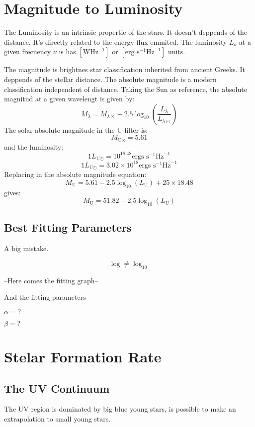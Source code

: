 \documentclass[manuscript]{aastex}
\begin{document}
\section{Magnitude to Luminosity}
The Luminosity is an intrinsic propertie of the stars. It doesn't deppends of the distance. 
It's directly related to the energy flux emmited. The luminosity $L_\nu$ at a given frecuency 
$\nu$ is has $[\textrm{W}\textrm{Hz}^{-1}]$ or $[\textrm{erg }\textrm{s}^{-1}\textrm{Hz}^{-1}]$ units.

The magnitude is brightnes star classification inherited from ancient Greeks. It deppends of 
the stellar distance. The absolute magnitude is a modern classification independent of 
distance. Taking the Sun as reference, the absolute magnitud at a given wavelengt is given by: 
\[ M_{\lambda} = M_{\lambda \odot} - 2.5 \log_{10}\left( \frac{L_\lambda}{L_{\lambda \odot}} \right) \]
The solar absolute magnitude in the U filter is:
\[ M_{\textrm{U} \odot} = 5.61\]
and the luminosity:
\[ 1 L_{\textrm{U} \odot} = 10^{18.48} \textrm{ergs s}^{-1}\textrm{Hz}^{-1}\]
\[ 1 L_{\textrm{U} \odot} = 3.02 \times 10^{18} \textrm{ergs s}^{-1}\textrm{Hz}^{-1}\]
Replacing in the absolute magnitude equation:
\[ M_{\textrm{U}} = 5.61 - 2.5 \log_{10}(L_{\textrm{U}}) + 25\times18.48\]
gives:
\[ M_{\textrm{U}} = 51.82 - 2.5 \log_{10}(L_{\textrm{U}}) \]

\subsection{Best Fitting Parameters}

\huge
A big mistake.

\[\log \neq \log_{10}\]
\normalsize

--Here comes the fitting graph--

And the fitting parameters

$\alpha = ?$

$\beta = ?$

\section{Stelar Formation Rate}

\subsection{The UV Continuum}
The UV region is dominated by big blue young stars, is possible to make an extrapolation to small young stars.
\end{document}
